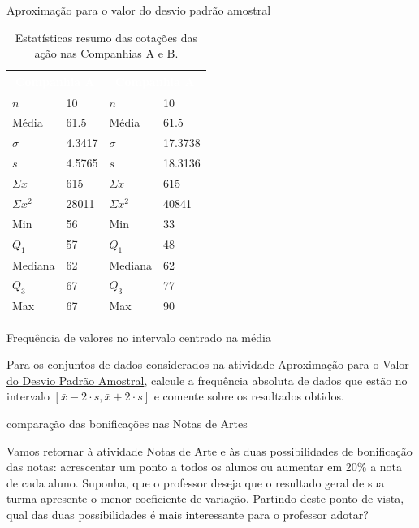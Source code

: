 {\begin{task}{Aproximação para o valor do desvio padrão amostral}
\begin{table}[H]
\centering
\begin{tabular}{|l|l|l|l|}
\hline
\multicolumn{2}{|c|}{\cellcolor{\currentcolor!80}\textcolor{white}{\textbf{Companhia A}}} & \multicolumn{2}{c|}{\cellcolor{\currentcolor!80}\textcolor{white}{\textbf{Companhia A}}} \\
\hline
$n$ & 10 & $n$ & 10 \\
\hline
Média & 61.5 & Média & 61.5 \\
\hline
$\sigma$ & 4.3417 & $\sigma$ & 17.3738 \\
\hline
$s$ & 4.5765 & $s$ & 18.3136 \\
\hline
$\Sigma x$ & 615 & $\Sigma x$ & 615 \\
\hline
$\Sigma x^2$ & 28011 & $\Sigma x^2$ & 40841 \\
\hline
Min & 56 & Min & 33 \\
\hline
$Q_1$ & 57 & $Q_1$ & 48 \\
\hline
Mediana & 62 & Mediana & 62 \\
\hline
$Q_3$ & 67 & $Q_3$ & 77 \\
\hline
Max & 67 & Max & 90 \\
\hline
\end{tabular}
\caption{Estatísticas resumo das cotações das ação nas Companhias A e B.}\label{\detokenize{PE104-5:fig-estrategia}}\label{\detokenize{PE104-5:id4}}
\end{table}
\end{task}

\label{\detokenize{PE104-5:ativ-mediamaisoumenosdoisdesvios}}
\begin{task}{Frequência de valores no intervalo centrado na média}

Para os conjuntos de dados considerados na atividade \hyperref[\detokenize{PE104-5:ativ-aproxima-dpa-usando-r}]{Aproximação para o Valor do Desvio Padrão Amostral}, calcule a frequência absoluta de dados que estão no intervalo \([\bar{x}-2\cdot s,\bar{x}+2\cdot s]\) e comente sobre os resultados obtidos.
\end{task}


\needspace{.2\textheight}
\begin{task}{comparação das bonificações nas Notas de Artes}

Vamos retornar à atividade \hyperref[\detokenize{PE104-0:ativ-notas-de-artes}]{Notas de Arte} e às duas possibilidades de bonificação das notas: acrescentar um ponto a todos os alunos ou aumentar em 20\% a nota de cada aluno. Suponha, que o professor deseja que o resultado geral de sua turma apresente o menor coeficiente de variação. Partindo deste ponto de vista, qual das duas possibilidades é mais interessante para o professor adotar?


\end{task}}
